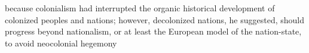 \documentclass[12pt]{article}
\title{}
\makeatletter
\newcommand\iraggedright{%
	\let\\\@centercr\@rightskip\@flushglue \rightskip\@rightskip
	\leftskip\z@skip}
\makeatother
\begin{document}
	\makeheader
	\iraggedright
	
	because colonialism had interrupted the organic historical development of colonized peoples and nations; however, decolonized nations, he suggested, should progress beyond nationalism, or at least the European model of the nation-state, to avoid neocolonial hegemony
	


\makeworkscited
\listoftodos
\end{document}
